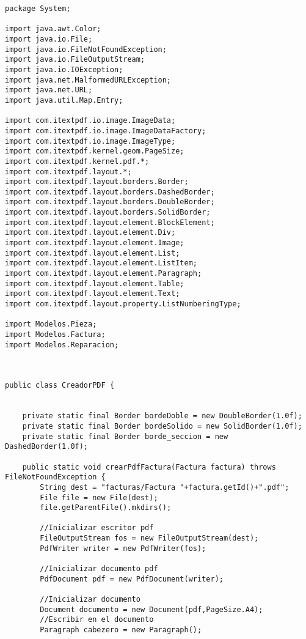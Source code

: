 \begin{lstlisting}[caption=CreadorPDF.java (App Escritorio)]
package System;

import java.awt.Color;
import java.io.File;
import java.io.FileNotFoundException;
import java.io.FileOutputStream;
import java.io.IOException;
import java.net.MalformedURLException;
import java.net.URL;
import java.util.Map.Entry;

import com.itextpdf.io.image.ImageData;
import com.itextpdf.io.image.ImageDataFactory;
import com.itextpdf.io.image.ImageType;
import com.itextpdf.kernel.geom.PageSize;
import com.itextpdf.kernel.pdf.*;
import com.itextpdf.layout.*;
import com.itextpdf.layout.borders.Border;
import com.itextpdf.layout.borders.DashedBorder;
import com.itextpdf.layout.borders.DoubleBorder;
import com.itextpdf.layout.borders.SolidBorder;
import com.itextpdf.layout.element.BlockElement;
import com.itextpdf.layout.element.Div;
import com.itextpdf.layout.element.Image;
import com.itextpdf.layout.element.List;
import com.itextpdf.layout.element.ListItem;
import com.itextpdf.layout.element.Paragraph;
import com.itextpdf.layout.element.Table;
import com.itextpdf.layout.element.Text;
import com.itextpdf.layout.property.ListNumberingType;

import Modelos.Pieza;
import Modelos.Factura;
import Modelos.Reparacion;



public class CreadorPDF {
	
	
	private static final Border bordeDoble = new DoubleBorder(1.0f);
	private static final Border bordeSolido = new SolidBorder(1.0f);
	private static final Border borde_seccion = new DashedBorder(1.0f);
	
    public static void crearPdfFactura(Factura factura) throws FileNotFoundException {
    	String dest = "facturas/Factura "+factura.getId()+".pdf";
    	File file = new File(dest);
		file.getParentFile().mkdirs();

    	//Inicializar escritor pdf
    	FileOutputStream fos = new FileOutputStream(dest);
    	PdfWriter writer = new PdfWriter(fos);
    	
    	//Inicializar documento pdf
    	PdfDocument pdf = new PdfDocument(writer);
    	
    	//Inicializar documento
    	Document documento = new Document(pdf,PageSize.A4);
    	//Escribir en el documento
		Paragraph cabezero = new Paragraph();


\end{lstlisting}
